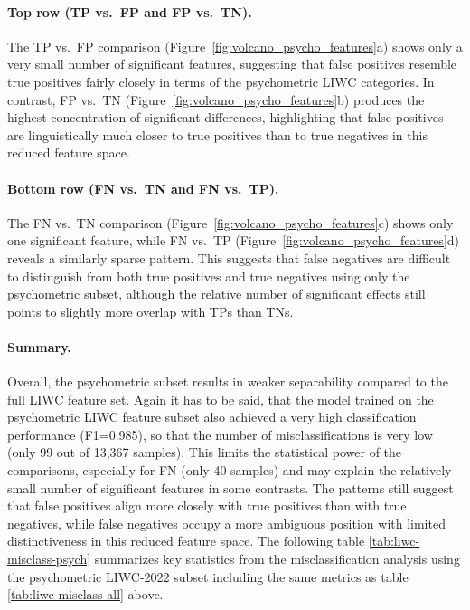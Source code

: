 \paragraph{Top row (TP vs.\ FP and FP vs.\ TN).}
The TP vs.\ FP comparison (Figure~\ref{fig:volcano_psycho_features}a) shows only a very small number of significant features, 
suggesting that false positives resemble true positives fairly closely in terms of the psychometric LIWC categories.  
In contrast, FP vs.\ TN (Figure~\ref{fig:volcano_psycho_features}b) produces the highest concentration of significant differences, 
highlighting that false positives are linguistically much closer to true positives than to true negatives in this reduced feature space.

\paragraph{Bottom row (FN vs.\ TN and FN vs.\ TP).}
The FN vs.\ TN comparison (Figure~\ref{fig:volcano_psycho_features}c) shows only one significant feature, 
while FN vs.\ TP (Figure~\ref{fig:volcano_psycho_features}d) reveals a similarly sparse pattern. 
This suggests that false negatives are difficult to distinguish from both true positives and true negatives using only the psychometric subset, 
although the relative number of significant effects still points to slightly more overlap with TPs than TNs.

\paragraph{Summary.}
Overall, the psychometric subset results in weaker separability compared to the full LIWC feature set. Again it has to be said, that the model trained on the psychometric LIWC feature subset also achieved a very high classification performance (F1=0.985), so that the number of misclassifications is very low (only 99 out of 13,367 samples). This limits the statistical power of the comparisons, especially for FN (only 40 samples) and may explain the relatively small number of significant features in some contrasts. The patterns still suggest that false positives align more closely with true positives than with true negatives, while false negatives occupy a more ambiguous position with limited distinctiveness in this reduced feature space. The following table \ref{tab:liwc-misclass-psych} summarizes key statistics from the misclassification analysis using the psychometric LIWC-2022 subset including the same metrics as table \ref{tab:liwc-misclass-all} above. 

